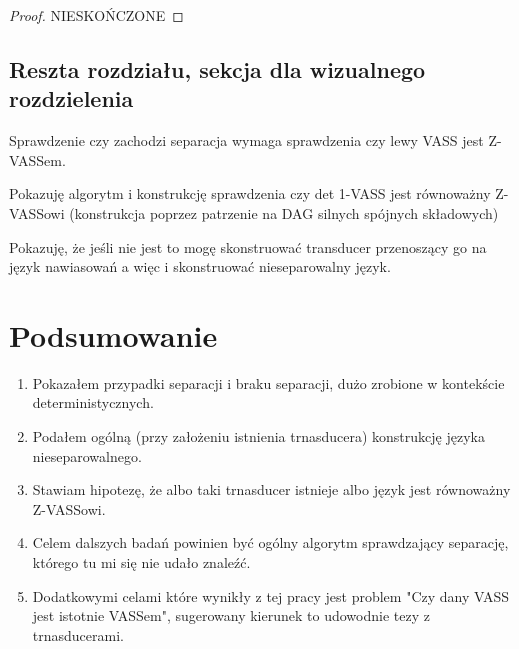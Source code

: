 \begin{proof}
        NIESKOŃCZONE

    \end{proof}

    \section{Reszta rozdziału, sekcja dla wizualnego rozdzielenia}
    Sprawdzenie czy zachodzi separacja wymaga sprawdzenia czy lewy VASS jest Z-VASSem.

    Pokazuję algorytm i konstrukcję sprawdzenia czy det 1-VASS jest równoważny Z-VASSowi (konstrukcja poprzez patrzenie na DAG silnych spójnych składowych)

    Pokazuję, że jeśli nie jest to mogę skonstruować transducer przenoszący go na język nawiasowań a więc i skonstruować nieseparowalny język.



    \chapter{Podsumowanie}
    \begin{enumerate}
        \item         Pokazałem przypadki separacji i braku separacji, dużo zrobione w kontekście deterministycznych.

        \item         Podałem ogólną (przy założeniu istnienia trnasducera) konstrukcję języka nieseparowalnego.

        \item         Stawiam hipotezę, że albo taki trnasducer istnieje albo język jest równoważny Z-VASSowi.

        \item         Celem dalszych badań powinien być ogólny algorytm sprawdzający separację, którego tu mi się nie udało znaleźć.

        \item         Dodatkowymi celami które wynikły z tej pracy jest problem "Czy dany VASS jest istotnie VASSem", sugerowany kierunek to udowodnie tezy
        z trnasducerami.

    \end{enumerate}


